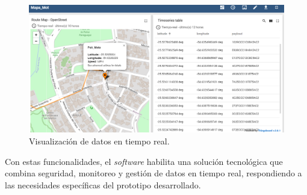 \begin{figure}[H]
\leavevmode
\begin{minipage}{\textwidth}
\begin{center}
\includegraphics[width=1.0\textwidth]{./capitulo_05/imagen/resulfin.png}
\caption{Visualización de datos en tiempo real.\label{fig:finresul}}
\end{center}
\end{minipage}
\end{figure}

Con estas funcionalidades, el \textit{software} habilita una solución tecnológica que combina seguridad, monitoreo y gestión de datos en tiempo real, respondiendo a las necesidades específicas del prototipo desarrollado.



